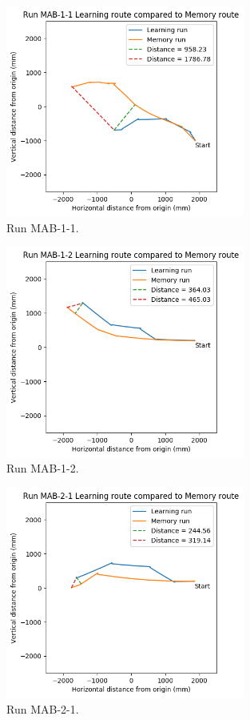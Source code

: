 \documentclass[a4paper,11pt,twoside,openright]{article}
\begin{document}
\begin{figure}[h!]
 \centering
  \includegraphics[width=0.7\textwidth]{MAB-1-1}
  \caption{
    \label{fig:mab-1-1} Run MAB-1-1.
  }
\end{figure}

\begin{figure}[h!]
 \centering
  \includegraphics[width=0.7\textwidth]{MAB-1-2}
  \caption{
    \label{fig:mab-1-2} Run MAB-1-2.
  }
\end{figure}

\begin{figure}[h!]
 \centering
  \includegraphics[width=0.7\textwidth]{MAB-2-1}
  \caption{
    \label{fig:mab-2-1} Run MAB-2-1.
  }
\end{figure}
\end{document}
